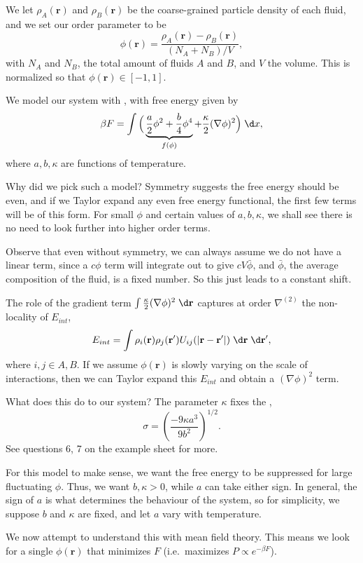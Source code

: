 \documentclass[a4paper]{article}
\begin{document}
We let $\rho_A(\mathbf{r})$ and $\rho_B(\mathbf{r})$ be the coarse-grained particle density of each fluid, and we set our order parameter to be
\[
  \phi(\mathbf{r}) = \frac{\rho_A(\mathbf{r}) - \rho_B(\mathbf{r})}{(N_A + N_B)/V},
\]
with $N_A$ and $N_B$, the total amount of fluids $A$ and $B$, and $V$ the volume. This is normalized so that $\phi(\mathbf{r}) \in [-1, 1]$.

We model our system with , with free energy given by
\[
  \beta F = \int \Big(\underbrace{\frac{a}{2} \phi^2 + \frac{b}{4} \phi^4}_{f(\phi)} + \frac{\kappa}{2} (\nabla \phi)^2\Big)\;\d x,
\]
where $a, b, \kappa$ are functions of temperature.

Why did we pick such a model? Symmetry suggests the free energy should be even, and if we Taylor expand any even free energy functional, the first few terms will be of this form. For small $\phi$ and certain values of $a, b, \kappa$, we shall see there is no need to look further into higher order terms.

Observe that even without symmetry, we can always assume we do not have a linear term, since a $c \phi$ term will integrate out to give $cV \bar{\phi}$, and $\bar{\phi}$, the average composition of the fluid, is a fixed number. So this just leads to a constant shift.

The role of the gradient term $\int \frac{\kappa}{2} (\nabla \phi)^2 \;\d \mathbf{r}$ captures at order $\nabla^{(2)}$ the non-locality of $E_{int}$,
\[
  E_{int} = \int \rho_i (\mathbf{r}) \rho_j(\mathbf{r}') U_{ij}(|\mathbf{r} - \mathbf{r}'|)\;\d \mathbf{r}\;\d \mathbf{r}',
\]
where $i, j \in A, B$. If we assume $\phi(\mathbf{r})$ is slowly varying on the scale of interactions, then we can Taylor expand this $E_{int}$ and obtain a $(\nabla \phi)^2$ term.

What does this do to our system? The parameter $\kappa$ fixes the ,
\[
  \sigma = \left(\frac{-9 \kappa a^3}{9 b^2}\right)^{1/2}.
\]
See questions 6, 7 on the example sheet for more.

For this model to make sense, we want the free energy to be suppressed for large fluctuating $\phi$. Thus, we want $b, \kappa > 0$, while $a$ can take either sign. In general, the sign of $a$ is what determines the behaviour of the system, so for simplicity, we suppose $b$ and $\kappa$ are fixed, and let $a$ vary with temperature.

We now attempt to understand this with mean field theory. This means we look for a single $\phi(\mathbf{r})$ that minimizes $F$ (i.e.\ maximizes $P \propto e^{-\beta F}$).
\end{document}
